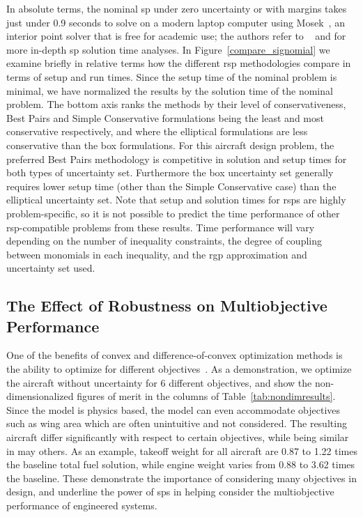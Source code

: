In absolute
terms, the nominal \gls{sp} under zero uncertainty or with margins
takes just under 0.9 seconds to solve on a modern laptop computer using Mosek~\cite{mosek},
an interior point solver that is free for academic use; the authors
refer to ~\cite{Kirschen2018Log} and \cite{York2018} for more in-depth \gls{sp} solution time analyses.
In Figure~\ref{compare_signomial} we examine briefly in relative terms
how the different \gls{rsp} methodologies compare in terms of setup and
run times. Since the setup time of the nominal problem is minimal,
we have normalized the results by the solution time of the nominal problem.
The bottom axis ranks the methods by their level of conservativeness, Best Pairs
and Simple Conservative formulations being the least and most conservative respectively,
and where the elliptical formulations are less conservative than the box formulations.
For this aircraft design problem, the preferred Best Pairs methodology
is competitive in solution and setup times for both types of uncertainty set. Furthermore
the box uncertainty set generally requires lower setup time (other than the Simple Conservative case)
than the elliptical uncertainty set.
Note that setup and solution times for \gls{rsp}s are highly problem-specific, so it is not possible
to predict the time performance of other \gls{rsp}-compatible problems from these results.
Time performance will vary depending on the number of inequality constraints,
the degree of coupling between monomials
in each inequality, and the \gls{rgp} approximation and uncertainty set used.

\subsection{The Effect of Robustness on Multiobjective Performance}

One of the benefits of convex and difference-of-convex optimization methods is the ability to optimize for
different objectives~\cite{York2018}. As a demonstration, we optimize the aircraft without uncertainty
for 6 different objectives, and show
the non-dimensionalized figures of merit in the columns of Table~\ref{tab:nondimresults}.
Since the model is physics based, {\color{blue}the model can even accommodate objectives such as wing area
which are often unintuitive and not considered. The resulting aircraft
differ significantly with respect to certain objectives, while being similar in may others.
As an example, takeoff weight for all aircraft are 0.87 to 1.22 times the baseline total fuel solution,
while engine weight varies from 0.88 to 3.62 times the baseline.
These demonstrate the importance of considering many objectives
in design, and underline the power of \gls{sp}s in helping
consider the multiobjective performance of engineered systems.}

